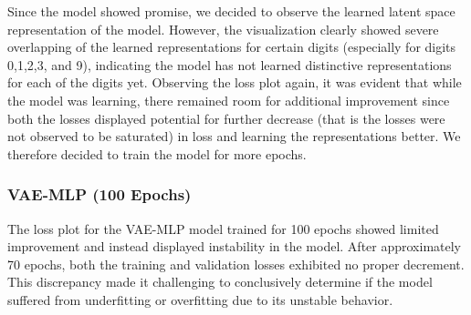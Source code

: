 \documentclass[12pt]{article}
\begin{document}
Since the model showed promise, we decided to observe the learned latent space representation of the model. However, the visualization clearly showed severe overlapping of the learned representations for certain digits (especially for digits 0,1,2,3, and 9), indicating the model has not learned distinctive representations for each of the digits yet. Observing the loss plot again, it was evident that while the model was learning, there remained room for additional improvement since both the losses displayed potential for further decrease (that is the losses were not observed to be saturated) in loss and learning the representations better. We therefore decided to train the model for more epochs.

\subsubsection{VAE-MLP (100 Epochs)}
The loss plot for the VAE-MLP model trained for 100 epochs showed limited improvement and instead displayed instability in the model. After approximately 70 epochs, both the training and validation losses exhibited no proper decrement. This discrepancy made it challenging to conclusively determine if the model suffered from underfitting or overfitting due to its unstable behavior.
\end{document}
